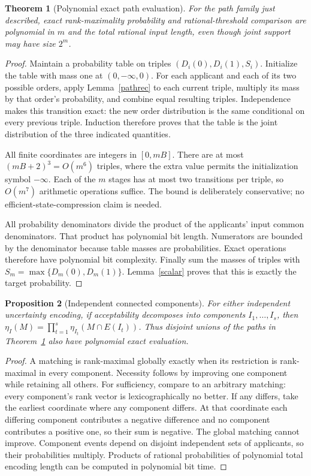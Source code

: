 \documentclass[11pt]{article}
\newtheorem{theorem}{Theorem}
\newtheorem{proposition}[theorem]{Proposition}
\theoremstyle{remark}
\begin{document}
\begin{theorem}[Polynomial exact path evaluation]\label{path}
For the path family just described, exact rank-maximality probability and rational-threshold comparison are polynomial in $m$ and the total rational input length, even though joint support may have size $2^m$.
\end{theorem}
\begin{proof}
Maintain a probability table on triples $(D_i(0),D_i(1),S_i)$. Initialize the table with mass one at $(0,-\infty,0)$. For each applicant and each of its two possible orders, apply Lemma~\ref{pathrec} to each current triple, multiply its mass by that order's probability, and combine equal resulting triples. Independence makes this transition exact: the new order distribution is the same conditional on every previous triple. Induction therefore proves that the table is the joint distribution of the three indicated quantities.

All finite coordinates are integers in $[0,mB]$. There are at most $(mB+2)^3=O(m^6)$ triples, where the extra value permits the initialization symbol $-\infty$. Each of the $m$ stages has at most two transitions per triple, so $O(m^7)$ arithmetic operations suffice. The bound is deliberately conservative; no efficient-state-compression claim is needed.

All probability denominators divide the product of the applicants' input common denominators. That product has polynomial bit length. Numerators are bounded by the denominator because table masses are probabilities. Exact operations therefore have polynomial bit complexity. Finally sum the masses of triples with $S_m=\max\{D_m(0),D_m(1)\}$. Lemma~\ref{scalar} proves that this is exactly the target probability.
\end{proof}

\begin{proposition}[Independent connected components]\label{components}
For either independent uncertainty encoding, if acceptability decomposes into components $I_1,\ldots,I_s$, then
$\eta_I(M)=\prod_{t=1}^s\eta_{I_t}(M\cap E(I_t))$.
Thus disjoint unions of the paths in Theorem~\ref{path} also have polynomial exact evaluation.
\end{proposition}
\begin{proof}
A matching is rank-maximal globally exactly when its restriction is rank-maximal in every component. Necessity follows by improving one component while retaining all others. For sufficiency, compare to an arbitrary matching: every component's rank vector is lexicographically no better. If any differs, take the earliest coordinate where any component differs. At that coordinate each differing component contributes a negative difference and no component contributes a positive one, so their sum is negative. The global matching cannot improve. Component events depend on disjoint independent sets of applicants, so their probabilities multiply. Products of rational probabilities of polynomial total encoding length can be computed in polynomial bit time.
\end{proof}
\end{document}
